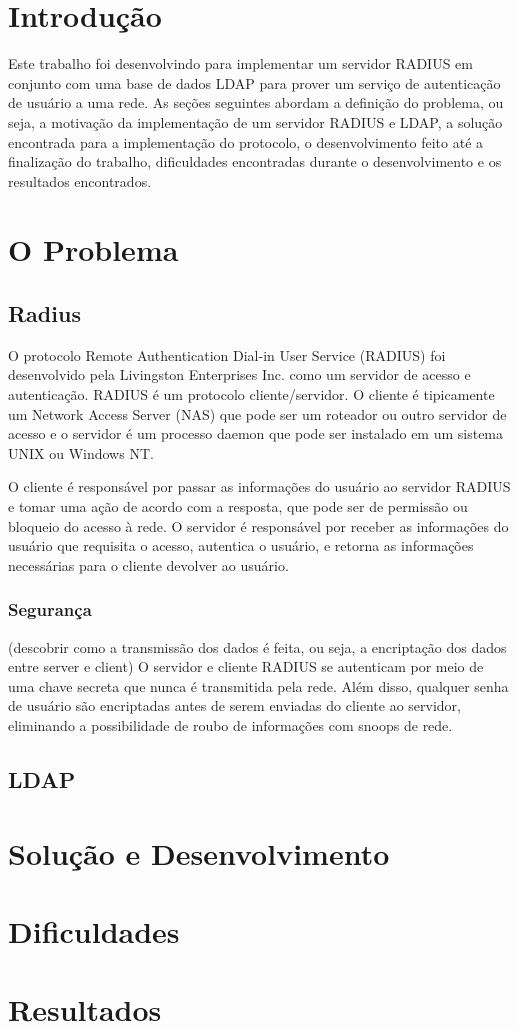 \section{Introdução}

Este trabalho foi desenvolvindo para implementar um servidor RADIUS em conjunto com uma
base de dados LDAP para prover um serviço de autenticação de usuário a uma rede.
As seções seguintes abordam a definição do problema, ou seja, a motivação da implementação
de um servidor RADIUS e LDAP, a solução encontrada para a implementação do protocolo, o
desenvolvimento feito até a finalização do trabalho, dificuldades encontradas durante o
desenvolvimento e os resultados encontrados.


\section{O Problema}

\subsection{Radius}

O protocolo Remote Authentication Dial-in User Service (RADIUS) foi desenvolvido pela
Livingston Enterprises Inc. como um servidor de acesso e autenticação. RADIUS é um
protocolo cliente/servidor. O cliente é tipicamente um Network Access Server (NAS) que
pode ser um roteador ou outro servidor de acesso e o servidor é um processo daemon que
pode ser instalado em um sistema UNIX ou Windows NT.

O cliente é responsável por passar as informações do usuário ao servidor RADIUS e tomar
uma ação de acordo com a resposta, que pode ser de permissão ou bloqueio do acesso à rede.
O servidor é responsável por receber as informações do usuário que requisita o acesso,
autentica o usuário, e retorna as informações necessárias para o cliente devolver ao usuário.

\subsubsection{Segurança}

(descobrir como a transmissão dos dados é feita, ou seja, a encriptação dos dados entre
server e client)
O servidor e cliente RADIUS se autenticam por meio de uma chave secreta que nunca é
transmitida pela rede. Além disso, qualquer senha de usuário são encriptadas antes de
serem enviadas do cliente ao servidor, eliminando a possibilidade de roubo de informações
com snoops de rede.

\subsection{LDAP}

\section{Solução e Desenvolvimento}

\section{Dificuldades}

\section{Resultados}

